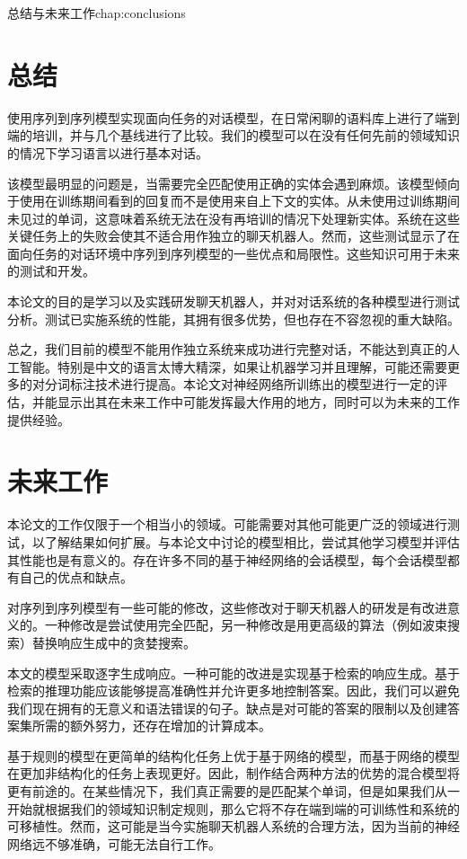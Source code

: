 \begin{cuzchapter}{总结与未来工作}{chap:conclusions}
\section{总结}\label{sec:background}
使用序列到序列模型实现面向任务的对话模型，在日常闲聊的语料库上进行了端到端的培训，并与几个基线进行了比较。我们的模型可以在没有任何先前的领域知识的情况下学习语言以进行基本对话。

该模型最明显的问题是，当需要完全匹配使用正确的实体会遇到麻烦。该模型倾向于使用在训练期间看到的回复而不是使用来自上下文的实体。从未使用过训练期间未见过的单词，这意味着系统无法在没有再培训的情况下处理新实体。系统在这些关键任务上的失败会使其不适合用作独立的聊天机器人。然而，这些测试显示了在面向任务的对话环境中序列到序列模型的一些优点和局限性。这些知识可用于未来的测试和开发。

本论文的目的是学习以及实践研发聊天机器人，并对对话系统的各种模型进行测试分析。测试已实施系统的性能，其拥有很多优势，但也存在不容忽视的重大缺陷。

总之，我们目前的模型不能用作独立系统来成功进行完整对话，不能达到真正的人工智能。特别是中文的语言太博大精深，如果让机器学习并且理解，可能还需要更多的对分词标注技术进行提高。本论文对神经网络所训练出的模型进行一定的评估，并能显示出其在未来工作中可能发挥最大作用的地方，同时可以为未来的工作提供经验。
\section{未来工作}\label{sec:background}
本论文的工作仅限于一个相当小的领域。可能需要对其他可能更广泛的领域进行测试，以了解结果如何扩展。与本论文中讨论的模型相比，尝试其他学习模型并评估其性能也是有意义的。存在许多不同的基于神经网络的会话模型，每个会话模型都有自己的优点和缺点。

对序列到序列模型有一些可能的修改，这些修改对于聊天机器人的研发是有改进意义的。一种修改是尝试使用完全匹配，另一种修改是用更高级的算法（例如波束搜索）替换响应生成中的贪婪搜索。

本文的模型采取逐字生成响应。一种可能的改进是实现基于检索的响应生成。基于检索的推理功能应该能够提高准确性并允许更多地控制答案。因此，我们可以避免我们现在拥有的无意义和语法错误的句子。缺点是对可能的答案的限制以及创建答案集所需的额外努力，还存在增加的计算成本。

基于规则的模型在更简单的结构化任务上优于基于网络的模型，而基于网络的模型在更加非结构化的任务上表现更好。因此，制作结合两种方法的优势的混合模型将更有前途的。在某些情况下，我们真正需要的是匹配某个单词，但是如果我们从一开始就根据我们的领域知识制定规则，那么它将不存在端到端的可训练性和系统的可移植性。然而，这可能是当今实施聊天机器人系统的合理方法，因为当前的神经网络远不够准确，可能无法自行工作。


\end{cuzchapter}
